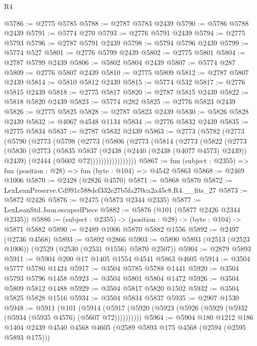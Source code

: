 \begin{lexlean}{R4}
\begin{coremodule}
@5786 := @2775 @5785
@5788 := @2787 @5783 @2439
@5790 := @5786 @5788 @2439
@5791 := @5774 @270
@5793 := @2776 @5791 @2439
@5794 := @2775 @5793
@5796 := @2787 @5791 @2439
@5798 := @5794 @5796 @2439
@5799 := @5774 @527
@5801 := @2776 @5799 @2439
@5802 := @2775 @5801
@5804 := @2787 @5799 @2439
@5806 := @5802 @5804 @2439
@5807 := @5774 @287
@5809 := @2776 @5807 @2439
@5810 := @2775 @5809
@5812 := @2787 @5807 @2439
@5814 := @5810 @5812 @2439
@5815 := @5774 @532
@5817 := @2776 @5815 @2439
@5818 := @2775 @5817
@5820 := @2787 @5815 @2439
@5822 := @5818 @5820 @2439
@5823 := @5774 @282
@5825 := @2776 @5823 @2439
@5826 := @2775 @5825
@5828 := @2787 @5823 @2439
@5830 := @5826 @5828 @2439
@5832 := @4067 @4548 @1134
@5834 := @2776 @5832 @2439
@5835 := @2775 @5834
@5837 := @2787 @5832 @2439
@5863 := @2773
    (@5782
      (@2773
        (@5790
          (@2773
            (@5798
              (@2773
                (@5806
                  (@2773
                    (@5814
                      (@2773
                        (@5822
                          (@2773
                            (@5830
                              (@2773
                                (@5835
                                  @5837
                                  (@2438 (@2440 (@2438 (@4077 @4573) @2439)) @2439)
                                  (@2444 (@5602 @72)))))))))))))))))
@5867 := fun (subject : @2355) => fun (position : @28) => fun (byte : @104) => @4542 @5863
@5868 := @2469 @1006
@5870 := @2428 (@2826 @4570)
@5871 := @5868 @5870
@5872 := LexLeanPreserve.Cd991c588def332e27b5fa270ca2a45c8.R4.__fits_27
@5873 := @5872 @2426
@5876 := @2475 (@5873 @2344 @2335)
@5877 := LexLeanStd.Json.escapedPiece
@5882 := @5876 (@101 (@5877 @2426 @2344 @2335))
@5886 := (subject : @2355) -> (position : @28) -> (byte : @104) -> @5871 @5882
@5890 := @2489 @1006 @5870 @5882 @1556
@5892 := @2497 (@2736 @4568)
@5893 := @5892 @2866
@5903 := @5890 @5893 (@2513 (@2523 @1006)) (@2529 (@2530 (@2531 @1556) @5870 @2507))
@5904 := @2879 @5893
@5911 := @5904 @200 @17 @1405 @1554 @4541 @5863 @4605
@5914 := @3504 @5777 @5780 @1424
@5917 := @3504 @5785 @5788 @1441
@5920 := @3504 @5793 @5796 @1458
@5923 := @3504 @5801 @5804 @1472
@5926 := @3504 @5809 @5812 @1488
@5929 := @3504 @5817 @5820 @1502
@5932 := @3504 @5825 @5828 @1516
@5934 := @3504 @5834 @5837
@5935 := @2907 @1530
@5948 := @5911
    (@101 (@5914 (@5917 (@5920 (@5923 (@5926 (@5929 (@5932 (@5934 (@5935 @4576) (@5607 @72))))))))))
@5964 := @5904
    @180
    @1212
    @186
    @1404
    @2439
    @4540
    @4568
    @4605
    (@2589 @5893 @175 @4568 (@2594 (@2595 @5893 @175)))

\end{coremodule}
\end{lexlean}

